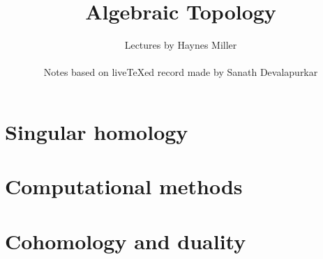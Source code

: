 \documentclass[11pt]{memoir}
\begin{document}
\title{Algebraic Topology}
\author{Lectures by Haynes Miller\\
\medskip

Notes based on live{\TeX}ed record made by Sanath Devalapurkar

}

\frontmatter

\maketitle

\newpage
\tableofcontents
\newpage

\mainmatter

%

\chapter{Singular homology}














\chapter{Computational methods}













\chapter{Cohomology and duality}













\end{document}
